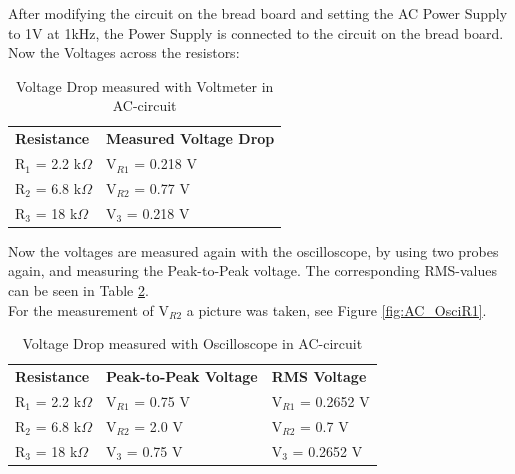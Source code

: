 After modifying the circuit on the bread board and setting the AC Power Supply to 1V at 1kHz, the Power Supply is connected to the circuit on the bread board. Now the Voltages across the resistors:
\\

\begin{table}[h]
\centering
\caption{Voltage Drop measured with Voltmeter in AC-circuit}
\label{tab:ResistanceAC1}
\begin{tabular}{ll}
\textbf{Resistance} & \textbf{Measured Voltage Drop} \\
R$_1$ = 2.2 k$\Omega$ & V$_{R1}$ = 0.218 V \\
R$_2$ = 6.8 k$\Omega$ & V$_{R2}$ = 0.77 V\\
R$_3$ = 18 k$\Omega$  & V$_3$ = 0.218 V                
\end{tabular}
\end{table}


Now the voltages are measured again with the oscilloscope, by using two probes again, and measuring the Peak-to-Peak voltage. The corresponding RMS-values can be seen in Table \ref{tab:ResistanceAC2}.\\
For the measurement of V$_{R2}$ a picture was taken, see Figure \ref{fig:AC_OsciR1}.



\begin{table}[h]
\centering
\caption{Voltage Drop measured with Oscilloscope in AC-circuit}
\label{tab:ResistanceAC2}
\begin{tabular}{lll}
\textbf{Resistance} & \textbf{Peak-to-Peak Voltage} & \textbf{RMS Voltage} \\
R$_1$ = 2.2 k$\Omega$ &  V$_{R1}$ = 0.75 V & V$_{R1}$ = 0.2652 V \\
R$_2$ = 6.8 k$\Omega$ & V$_{R2}$ = 2.0 V & V$_{R2}$ = 0.7 V \\
R$_3$ = 18 k$\Omega$ & V$_3$ = 0.75 V & V$_3$ = 0.2652 V             
\end{tabular}
\end{table}


